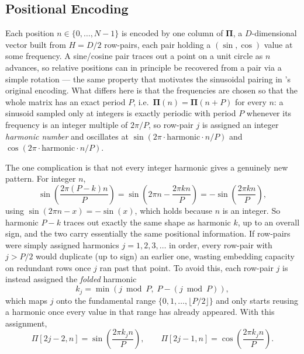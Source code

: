 \documentclass[11pt]{article}
\begin{document}
\subsection{Positional Encoding}
\label{sec:pe}

Each position $n \in \{0, \dots, N-1\}$ is encoded by one column of $\mathbf{\Pi}$, a $D$-dimensional vector built from $H = D/2$ row-pairs, each pair holding a $(\sin, \cos)$ value at some frequency. A sine/cosine pair traces out a point on a unit circle as $n$ advances, so relative positions can in principle be recovered from a pair via a simple rotation --- the same property that motivates the sinusoidal pairing in \citet{vaswani2017attention}'s original encoding. What differs here is that the frequencies are chosen so that the whole matrix has an exact period $P$, i.e.\ $\mathbf{\Pi}(n) = \mathbf{\Pi}(n+P)$ for every $n$: a sinusoid sampled only at integers is exactly periodic with period $P$ whenever its frequency is an integer multiple of $2\pi/P$, so row-pair $j$ is assigned an integer \emph{harmonic number} and oscillates at $\sin(2\pi \cdot \text{harmonic} \cdot n / P)$ and $\cos(2\pi \cdot \text{harmonic} \cdot n / P)$.

The one complication is that not every integer harmonic gives a genuinely new pattern. For integer $n$,
\[
  \sin\!\left(\frac{2\pi (P-k) n}{P}\right) = \sin\!\left(2\pi n - \frac{2\pi k n}{P}\right) = -\sin\!\left(\frac{2\pi k n}{P}\right),
\]
using $\sin(2\pi n - x) = -\sin(x)$, which holds because $n$ is an integer. So harmonic $P-k$ traces out exactly the same shape as harmonic $k$, up to an overall sign, and the two carry essentially the same positional information. If row-pairs were simply assigned harmonics $j = 1, 2, 3, \dots$ in order, every row-pair with $j > P/2$ would duplicate (up to sign) an earlier one, wasting embedding capacity on redundant rows once $j$ ran past that point. To avoid this, each row-pair $j$ is instead assigned the \emph{folded} harmonic
\[
  k_j = \min(j \bmod P,\; P - (j \bmod P)),
\]
which maps $j$ onto the fundamental range $\{0, 1, \dots, \lfloor P/2 \rfloor\}$ and only starts reusing a harmonic once every value in that range has already appeared. With this assignment,
\[
  \Pi[2j-2, n] = \sin\!\left(\frac{2\pi k_j n}{P}\right), \qquad
  \Pi[2j-1, n] = \cos\!\left(\frac{2\pi k_j n}{P}\right).
\]
\end{document}
